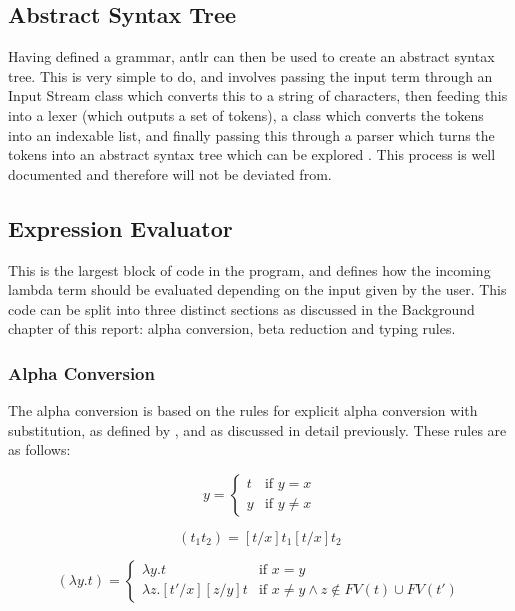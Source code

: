 \documentclass[a4paper,12pt]{report}
\begin{document}
\subsection{Abstract Syntax Tree}

Having defined a grammar, antlr can then be used to create an abstract syntax tree. This is very simple to do, and involves passing the input term through an Input Stream class which converts this to a string of characters, then feeding this into a lexer (which outputs a set of tokens), a class which converts the tokens into an indexable list, and finally passing this through a parser which turns the tokens into an abstract syntax tree which can be explored \cite{Tomassetti2007}. This process is well documented and therefore will not be deviated from.\\

\subsection{Expression Evaluator}
This is the largest block of code in the program, and defines how the incoming lambda term should be evaluated depending on the input given by the user. This code can be split into three distinct sections as discussed in the Background chapter of this report: alpha conversion, beta reduction and typing rules.

\subsubsection{Alpha Conversion}
The alpha conversion is based on the rules for explicit alpha conversion with substitution, as defined by \cite{Acar2008}, and as discussed in detail previously. These rules are as follows:

\begin{equation}
[t/x]y=\begin{cases}
t & \text{if $y=x$}\\
y & \text{if $y\ne x$}
\end{cases}
\end{equation}

\begin{equation}
[t/x](t_1t_2)=[t/x]t_1[t/x]t_2
\end{equation}

\begin{equation}
[t'/x](\lambda y.t)=\begin{cases}
\lambda y.t & \text{if $x=y$}\\
\lambda z.[t'/x][z/y]t & \text{if $x\ne y \land z\notin FV(t) \cup FV(t')$}
\end{cases}
\end{equation}
\end{document}
